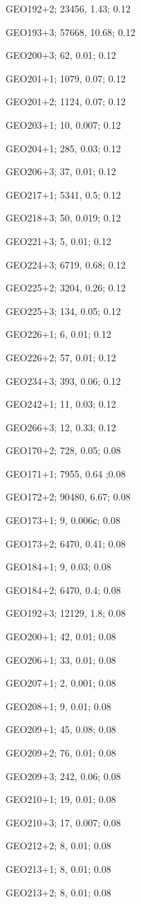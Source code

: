 GEO192+2; 23456, 1.43; 0.12

GEO193+3; 57668, 10.68; 0.12

GEO200+3; 62, 0.01; 0.12

GEO201+1; 1079, 0.07; 0.12

GEO201+2; 1124, 0.07; 0.12

GEO203+1; 10, 0.007; 0.12

GEO204+1; 285, 0.03; 0.12

GEO206+3; 37, 0.01; 0.12

GEO217+1; 5341, 0.5; 0.12

GEO218+3; 50, 0.019; 0.12

GEO221+3; 5, 0.01; 0.12

GEO224+3; 6719, 0.68; 0.12

GEO225+2; 3204, 0.26; 0.12

GEO225+3; 134, 0.05; 0.12

GEO226+1; 6, 0.01; 0.12

GEO226+2; 57, 0.01; 0.12

GEO234+3; 393, 0.06; 0.12

GEO242+1; 11, 0.03; 0.12

GEO266+3; 12, 0.33; 0.12

GEO170+2; 728, 0.05; 0.08

GEO171+1; 7955, 0.64 ;0.08

GEO172+2; 90480, 6.67; 0.08

GEO173+1; 9, 0.006с; 0.08

GEO173+2; 6470, 0.41; 0.08

GEO184+1; 9, 0.03; 0.08

GEO184+2; 6470, 0.4; 0.08

GEO192+3; 12129, 1.8; 0.08

GEO200+1; 42, 0.01; 0.08

GEO206+1; 33, 0.01; 0.08

GEO207+1; 2, 0.001; 0.08

GEO208+1; 9, 0.01; 0.08

GEO209+1; 45, 0.08; 0.08

GEO209+2; 76, 0.01; 0.08

GEO209+3; 242, 0.06; 0.08

GEO210+1; 19, 0.01; 0.08

GEO210+3; 17, 0.007; 0.08

GEO212+2; 8, 0.01; 0.08

GEO213+1; 8, 0.01; 0.08

GEO213+2; 8, 0.01; 0.08

